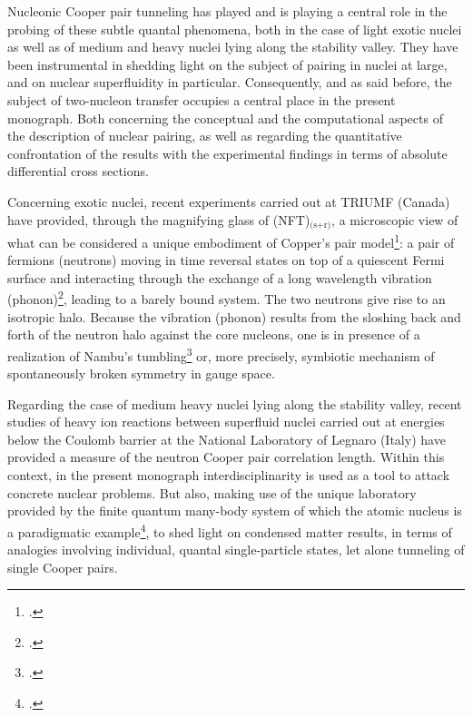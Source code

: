   
 Nucleonic Cooper pair tunneling has played and is playing a central role in the probing of these subtle quantal phenomena, both in the case of  light exotic nuclei as well as of medium and heavy nuclei lying along the stability valley. They  have been instrumental in shedding light on the subject of pairing in nuclei at large, and on nuclear superfluidity in particular. Consequently, and as said before, the subject of two-nucleon transfer occupies  a central place in the present monograph. Both concerning the conceptual and the computational aspects of the description of nuclear pairing, as well as regarding the quantitative confrontation of the results  with the experimental findings in terms of absolute differential cross sections.

Concerning exotic nuclei, recent experiments carried out at TRIUMF (Canada) have provided, through the magnifying glass of (NFT)$_\text{(s+r)}$, a microscopic view of what can be considered a unique embodiment of Copper's pair model\footnote{\cite{Cooper:56}.}: a pair of fermions (neutrons) moving in time reversal states on top of a quiescent Fermi surface and interacting through the exchange of a long wavelength vibration (phonon)\footnote{\cite{Frohlich:52,Bardeen:55,Bardeen:57a,Bardeen:57b}.}, leading to a barely bound system. The two neutrons give rise to an isotropic halo. Because the vibration (phonon) results from the sloshing back and forth of the neutron halo against the core nucleons, one is in presence of a realization of Nambu's tumbling\footnote{\cite{Nambu:91}.} or, more precisely, symbiotic mechanism of spontaneously broken symmetry in gauge space.

Regarding the case of medium heavy nuclei lying along the stability valley, recent studies of heavy ion reactions between superfluid nuclei carried out at energies below the Coulomb barrier at the National Laboratory of Legnaro (Italy) have provided a measure of the neutron Cooper pair correlation length. Within this context, in the present monograph interdisciplinarity is used as a tool to attack concrete nuclear problems. But also, making use of the unique laboratory provided by the finite quantum many-body system of which the atomic nucleus is a paradigmatic example\footnote{\cite{Bohr:19}.}, to shed light on condensed matter results, in terms of analogies involving individual, quantal single-particle states, let alone tunneling of single Cooper pairs.


